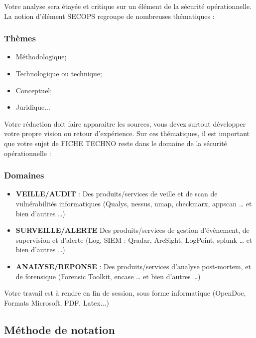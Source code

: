 Votre  analyse sera étayée et critique sur un élément de la sécurité opérationnelle. La notion d'élément SECOPS regroupe de nombreuses thématiques :
\begin{frame}
\frametitle<presentation>{Thèmes}
\begin{itemize}
  \item Méthodologique;
  \item Technologique ou technique;
  \item Conceptuel;
  \item Juridique...
\end{itemize}

\end{frame}

Votre rédaction doit faire apparaitre les sources, vous devez surtout développer votre propre vision ou retour d'expérience.
Sur ces thématiques, il est important que votre sujet de FICHE TECHNO reste dans le domaine de la sécurité opérationnelle :

\begin{frame}
\frametitle<presentation>{Domaines}
\begin{itemize}
  \item \textbf{VEILLE/AUDIT} : Des produits/services de veille et de scan de vulnérabilités informatiques (Qualys, nessus, nmap, checkmarx, appscan … et bien d’autres …) 
  \item \textbf{SURVEILLE/ALERTE} Des produits/services de gestion d’événement, de supervision et d’alerte (Log, SIEM : Qradar, ArcSight, LogPoint, splunk … et bien d’autres …)
  \item \textbf{ANALYSE/REPONSE} : Des produits/services d’analyse post-mortem, et de forensique (Forensic Toolkit, encase … et bien d’autres …)
\end{itemize}

\end{frame}

Votre travail est à rendre en fin de session, sous forme informatique (OpenDoc, Formats Microsoft, PDF, Latex...)

\subsection{Méthode de notation}

